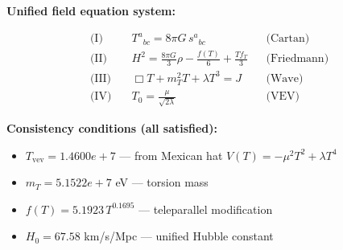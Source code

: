 
\textbf{Unified field equation system:}

\begin{align}
  \text{(I)} \quad & T^a{}_{bc} = 8\pi G \, s^a{}_{bc} && \text{(Cartan)} \\
  \text{(II)} \quad & H^2 = \frac{8\pi G}{3}\rho - \frac{f(T)}{6} + \frac{Tf_T}{3} && \text{(Friedmann)} \\
  \text{(III)} \quad & \Box T + m_T^2 T + \lambda T^3 = J && \text{(Wave)} \\
  \text{(IV)} \quad & T_0 = \frac{\mu}{\sqrt{2\lambda}} && \text{(VEV)}
\end{align}

\textbf{Consistency conditions (all satisfied):}
\begin{itemize}
  \item $T_{\text{vev}} = 1.4600e+7$ — from Mexican hat $V(T) = -\mu^2 T^2 + \lambda T^4$
  \item $m_T = 5.1522e+7$ eV — torsion mass
  \item $f(T) = 5.1923 \, T^{0.1695}$ — teleparallel modification
  \item $H_0 = 67.58$ km/s/Mpc — unified Hubble constant
\end{itemize}